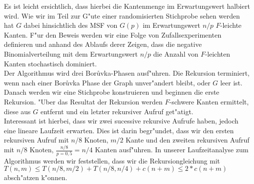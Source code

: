 \documentclass[a4paper,12pt,times,german]{cls/summary}
\begin{document}
    Es ist leicht ersichtlich, dass hierbei die Kantenmenge im Erwartungswert
    halbiert wird.
    Wie wir im Teil zur G"ute einer randomisierten Stichprobe sehen werden 
    hat $G$ dabei hinsichtlich des MSF von $G(p)$ im Erwartungswert $n/p$
    $F$-leichte Kanten. 
    F"ur den Beweis werden wir eine Folge von Zufallsexperimenten definieren
    und anhand des Ablaufs derer Zeigen, dass die negative Binomialverteilung
    mit dem Erwartungswert $n/p$ die Anzahl von $F$-leichten Kanten stochastisch
    dominiert.\\
Der Algorithmus wird drei Bor\r uvka-Phasen ausf"uhren.
    Die Rekursion terminiert, wenn nach einer Bor\r uvka Phase der Graph 
    unver"andert bleibt, oder $G$ leer ist.
    Danach werden wir eine Stichprobe konstruieren und beginnen die erste
    Rekursion.
    "Uber das Resultat der Rekursion werden $F$-schwere Kanten ermittelt, 
    diese aus $G$ entfernt und ein letzter rekursiver Aufruf get"atigt.\\
Interessant ist hierbei, dass wir zwei sucessive rekursive Aufrufe haben, jedoch
    eine lineare Laufzeit erwarten.
    Dies ist darin begr"undet, dass wir den ersten rekursiven Aufruf mit 
    $n/8$ Knoten, $m/2$ Kante und den zweiten rekursiven Aufruf mit $n/8$ Knoten,
    $\frac{n/8}{p=0,5} = n/4$ Kanten ausf"uhren.
    In unserer Laufzeitanalyse zum Algorithmus werden wir feststellen, dass
    wir die Rekursiongleichung mit 
    $T(n,m) \leq T(n/8,m/2) + T(n/8, n/4) + c(n+m) \leq 2*c(n+m)$
    absch"atzen k"onnen.\\
\end{document}
